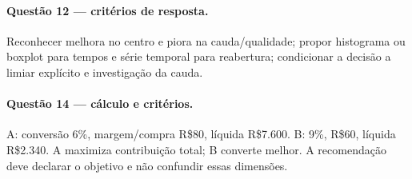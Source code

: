 \paragraph{Questão 12 — critérios de resposta.} Reconhecer melhora no centro e piora na cauda/qualidade; propor histograma ou boxplot para tempos e série temporal para reabertura; condicionar a decisão a limiar explícito e investigação da cauda.
\paragraph{Questão 14 — cálculo e critérios.} A: conversão 6\%, margem/compra R\$80, líquida R\$7.600. B: 9\%, R\$60, líquida R\$2.340. A maximiza contribuição total; B converte melhor. A recomendação deve declarar o objetivo e não confundir essas dimensões.
